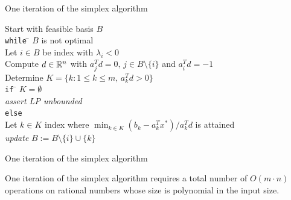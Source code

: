 \pagestyle{empty}


\begin{frame}{One iteration of the simplex algorithm}

 \begin{tabbing}
    Start with feasible basis $B$ \\[1ex]
    {\tt while} \= $B$ is not optimal \\ [.7ex]
    \> Let $i \in B$ be index with $\lambda_i<0$ \\
    \> Compute  $d \in \mathbb{R}^n$ with $a_j^T d = 0, \, j \in B \setminus\{i\}$
    and $a_i^T d = -1$ \\ 
    \> Determine $K = \{ k \colon 1 \leq k \leq m, \, a_k^Td >0\}$\\[.7ex]  
    \> {\tt if} \= $K = \emptyset$ \\   
    \> \> \emph{assert LP unbounded} \\
    \> {\tt else} \\
    \> \> Let $k \in K$ index where 
    $
    \displaystyle \min_{k \in K} (b_k - a_k^Tx^*)/a_k^Td
    $
    is attained \\ %
    
    \> \>\emph{update} $B := B \setminus\{i\} \cup \{k\}$             
  \end{tabbing}
  
  
\end{frame}


\begin{frame}
  
\end{frame}

\begin{frame}{One iteration of the simplex algorithm}



\begin{theorem}
  \label{thr-a-4}
  One iteration of the simplex algorithm requires a total number of
  $O(m\cdot n)$ operations on rational numbers whose size is polynomial
  in the input size. 
\end{theorem}

  \begin{columns}
    \begin{column}{.5\textwidth}
      
    \end{column}
    \begin{column}{.5\textwidth}
      
    \end{column}       
  \end{columns}
\end{frame}




